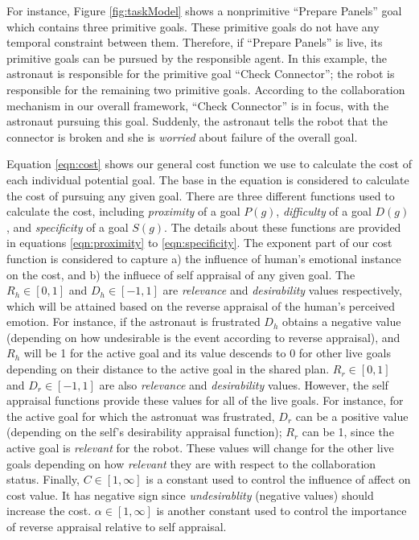 \documentclass[conference]{IEEEtran}
\begin{document}
For instance, Figure \ref{fig:taskModel} shows a nonprimitive ``Prepare Panels''
goal which contains three primitive goals. These primitive goals do not have any
temporal constraint between them. Therefore, if ``Prepare Panels'' is live, its
primitive goals can be pursued by the responsible agent. In this example, the
astronaut is responsible for the primitive goal ``Check Connector''; the robot
is responsible for the remaining two primitive goals. According to the
collaboration mechanism in our overall framework, ``Check Connector'' is in
focus, with the astronaut pursuing this goal. Suddenly, the astronaut tells the
robot that the connector is broken and she is \textit{worried} about failure of
the overall goal.

Equation \ref{eqn:cost} shows our general cost function we use to calculate the
cost of each individual potential goal. The base in the equation is considered
to calculate the cost of pursuing any given goal. There are three different
functions used to calculate the cost, including \textit{proximity} of a goal
$P(g)$, \textit{difficulty} of a goal $D(g)$, and \textit{specificity} of a
goal $S(g)$. The details about these functions are provided in equations
\ref{eqn:proximity} to \ref{eqn:specificity}. The exponent part of our cost
function is considered to capture a) the influence of human's emotional instance
on the cost, and b) the influece of self appraisal of any given goal. The
$R_h\in[0,1]$ and $D_h\in[-1,1]$  are \textit{relevance} and
\textit{desirability} values respectively, which will be attained based on the
reverse appraisal of the human's perceived emotion. For instance, if the
astronaut is frustrated $D_h$ obtains a negative value (depending on how
undesirable is the event according to reverse appraisal), and $R_h$ will be 1
for the active goal and its value descends to 0 for other live goals depending
on their distance to the active goal in the shared plan. $R_r\in[0,1]$ and
$D_r\in[-1,1]$ are also \textit{relevance} and \textit{desirability} values.
However, the self appraisal functions provide these values for all of the live
goals. For instance, for the active goal for which the astronuat was frustrated,
$D_r$ can be a positive value (depending on the self's desirability appraisal
function); $R_r$ can be 1, since the active goal is \textit{relevant} for the
robot. These values will change for the other live goals depending on how
\textit{relevant} they are with respect to the collaboration status. Finally,
$C\in[1,\infty]$ is a constant used to control the influence of affect on cost
value. It has negative sign since \textit{undesirablity} (negative values)
should increase the cost. $\alpha\in[1,\infty]$ is another constant used to
control the importance of reverse appraisal relative to self appraisal.
\end{document}
